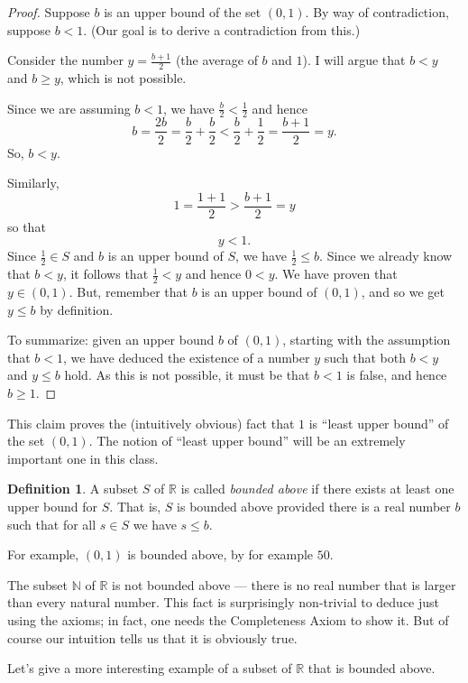 \documentclass[12pt]{amsart}
\newcommand{\R}{{\mathbb{R}}}
\newcommand{\N}{\mathbb{N}}
\numberwithin{equation}{section}
\theoremstyle{plain} %
\theoremstyle{definition}
\newtheorem{defn}[equation]{Definition}
\theoremstyle{remark}
\begin{document}
\begin{proof} Suppose $b$ is an upper bound of the set $(0,1)$. By way of contradiction, suppose $b < 1$. (Our goal is
  to derive a contradiction from this.)


 Consider the number $y = \frac{b+1}{2}$ (the
  average of $b$ and $1$). I will argue that $b < y$ and $b \geq y$, which is not possible.

Since we are assuming $b < 1$, we have $\frac{b}{2} < \frac12$ and hence
$$
b = \frac{2b}{2} = \frac{b}{2}+ \frac{b}{2} < \frac{b}{2} + \frac{1}{2} = \frac{b+1}{2} = y.
$$
So,  $b < y$. 

Similarly, 
$$
1 = \frac{1 + 1}{2} > \frac{b+1}{2} = y
$$
so that
$$
y < 1.
$$
Since $\frac12 \in S$ and $b$ is an upper bound of $S$, we have $\frac12 \leq b$. Since we already know that $b < y$, it follows that
$\frac12 < y$
and hence $0 < y$. We have proven that $y \in (0,1)$. But, 
remember that $b$ is an upper bound of $(0,1)$, and so we get $y \leq b$ by definition.

To summarize: given an upper bound $b$ of $(0,1)$, starting with the assumption that $b < 1$,
we have deduced the existence of a number $y$ such that  both $b < y$ and $y \leq b$ hold.
As this is not possible, it must be that $b < 1$ is false, and hence $b \geq 1$. 
\end{proof}

This claim proves the (intuitively obvious) fact that $1$ is ``least upper bound'' of the set $(0,1)$. The notion of ``least upper bound''
will be an extremely important one in this class.


\begin{defn} A subset $S$ of $\R$ is called {\em bounded above} if there exists at least one upper bound for $S$. That is, $S$ is bounded above provided there
  is a real number $b$ such that for all $s \in S$ we have $s \leq b$.
\end{defn}

For example, $(0,1)$ is bounded above, by for example $50$.  

The subset $\N$ of $\R$ is not bounded above --- there is no real
number that is larger than every natural number. This  fact is surprisingly non-trivial to deduce just using
the axioms; in fact, one needs the Completeness Axiom to show it.  But of course our intuition tells us that it is obviously true. 


Let's give a more interesting example of a subset of $\R$ that is bounded above.  
\end{document}
